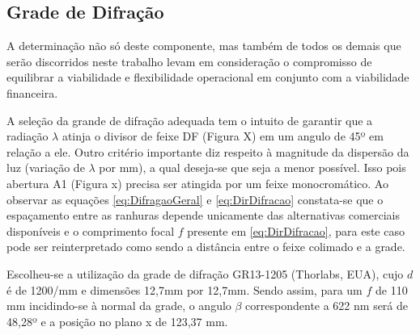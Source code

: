 \documentclass[oneside,openright,12pt]{ufsm_2021} %
\begin{document}
        \subsection{Grade de Difração}
            \par A determinação não só deste componente, mas também de todos os demais que serão discorridos neste trabalho levam em consideração o compromisso de equilibrar a viabilidade e flexibilidade operacional em conjunto com a viabilidade financeira. 
            \par A seleção da grande de difração adequada tem o intuito de garantir que a radiação $\lambda$ atinja o divisor de feixe DF (Figura X) em um angulo de 45º em relação a ele. Outro critério importante diz respeito à magnitude da dispersão da luz (variação de $\lambda$ por mm), a qual deseja-se que seja a menor possível. Isso pois abertura A1 (Figura x) precisa ser atingida por um feixe monocromático. Ao observar as equações \ref{eq:DifragaoGeral} e \ref{eq:DirDifracao} constata-se que o espaçamento entre as ranhuras depende unicamente das alternativas comerciais disponíveis e o comprimento focal $f$ presente em \ref{eq:DirDifracao}, para este caso pode ser reinterpretado como sendo a distância entre o feixe colimado e a grade.
            
            \par Escolheu-se a utilização da grade de difração GR13-1205 (Thorlabs, EUA), cujo $d$ é de 1200/mm e dimensões 12,7mm por 12,7mm. Sendo assim, para um $f$ de 110 mm incidindo-se à normal da grade, o angulo $\beta$ correspondente a 622 nm será de 48,28º e a posição no plano x de 123,37 mm.
\end{document}
